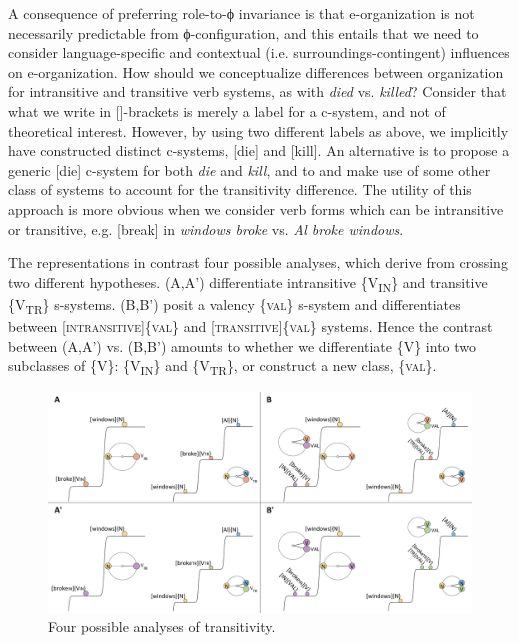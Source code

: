   A consequence of preferring role-to-ϕ invariance is that e-organization is not necessarily predictable from ϕ-configuration, and this entails that we need to consider language-specific and contextual (i.e. surroundings-contingent) influences on e-organization. How should we conceptualize differences between organization for intransitive and transitive verb systems, as with \textit{died} vs. \textit{killed}? Consider that what we write in []-brackets is merely a label for a c-system, and not of theoretical interest. However, by using two different labels as above, we implicitly have constructed distinct c-systems, [die] and [kill]. An alternative is to propose a generic [die] c-system for both \textit{die} and \textit{kill}, and to and make use of some other class of systems to account for the transitivity difference. The utility of this approach is more obvious when we consider verb forms which can be intransitive or transitive, e.g. [break] in \textit{windows broke} vs. \textit{Al broke windows}. 

  The representations in {} contrast four possible analyses, which derive from crossing two different hypotheses. (A,A') differentiate intransitive \{V\textsubscript{IN}\} and transitive \{V\textsubscript{TR}\} s-systems. (B,B') posit a valency \{\textsc{val}\} s-system and differentiates between [\textsc{intransitive}]\{\textsc{val}\} and [\textsc{transitive}]\{\textsc{val}\} systems. Hence the contrast between (A,A') vs. (B,B') amounts to whether we differentiate \{V\} into two subclasses of \{V\}: \{V\textsubscript{IN}\} and \{V\textsubscript{TR}\}, or construct a new class, \{\textsc{val}\}.

  
\begin{figure}
\includegraphics[width=\textwidth]{figures/Tilsen-img72.png}
\caption{Four possible analyses of transitivity.}
\label{fig:4:22}
\end{figure}
 

